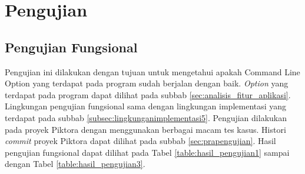 \section{Pengujian}
\label{sec:pengujian}

\subsection{Pengujian Fungsional}
\label{sec:pengujian_fungsional} 
Pengujian ini dilakukan dengan tujuan untuk mengetahui apakah Command Line Option yang terdapat pada program sudah berjalan dengan baik. \textit{Option} yang terdapat pada program dapat dilihat pada subbab \ref{sec:analisis_fitur_aplikasi}. Lingkungan pengujian fungsional sama dengan lingkungan implementasi yang terdapat pada subbab \ref{subsec:lingkunganimplementasi5}. Pengujian dilakukan pada proyek Piktora dengan menggunakan berbagai macam tes kasus. Histori \textit{commit} proyek Piktora dapat dilihat pada subbab \ref{sec:prapengujian}. Hasil pengujian fungsional dapat dilihat pada Tabel \ref{table:hasil_pengujian1} sampai dengan Tabel \ref{table:hasil_pengujian3}.


